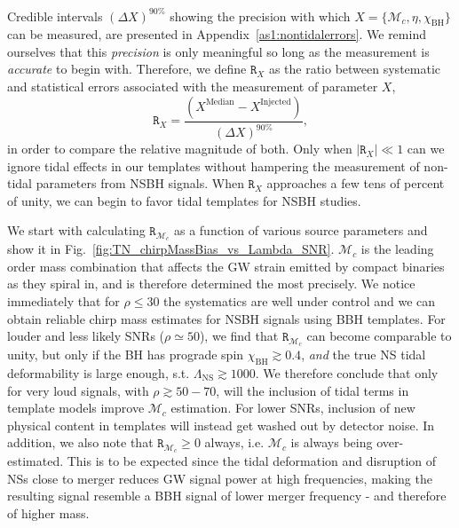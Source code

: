 \documentclass[aps,prd,amsmath,floats,floatfix, twocolumn,
superscriptaddress,nofootinbib,showpacs]{revtex4-1}
\newcommand{\lambdans}{\Lambda_\mathrm{NS}}
\newcommand{\chibh}{\chi_\mathrm{BH}}
\newcommand{\mchirp}{\mathcal{M}_c}
\newcommand{\arr}{\mathtt{R}}
\begin{document}
Credible intervals $(\Delta X)^{90\%}$ showing the precision with which
$X=\{\mchirp,\eta,\chibh\}$ can be measured, are presented in
Appendix~\ref{as1:nontidalerrors}.
We remind ourselves that this {\it precision} is only meaningful so long as the
measurement is {\it accurate} to begin with. Therefore, we define $\arr_X$ as
the ratio between systematic and statistical errors associated with the
measurement of parameter $X$,
\begin{equation}\label{eq:arr}
\arr_X = \dfrac{(X^\mathrm{Median} - X^\mathrm{Injected})}{(\Delta X)^{90\%}},
\end{equation}
in order to compare the relative magnitude of both. Only when
$|\arr_X| \ll 1$ can we ignore tidal effects in our templates
without hampering the measurement of non-tidal parameters from NSBH signals.
When $\arr_X$ approaches a few tens of percent of unity, we can begin to favor
tidal templates for NSBH studies.


We start with calculating $\arr_{\mchirp}$ as a function of various source
parameters and show it in Fig.~\ref{fig:TN_chirpMassBias_vs_Lambda_SNR}.
$\mchirp$ is the leading order
mass combination that affects the GW strain emitted by compact binaries as they
spiral in, and is therefore determined the most precisely. We notice
immediately that for $\rho\leq 30$ the systematics are well under control
and we can obtain reliable chirp mass estimates for NSBH signals using BBH
templates.
% 
For louder and less likely SNRs ($\rho\simeq 50$), we find that
$\arr_{\mchirp}$ can become comparable to unity, but only if the BH has
prograde spin $\chibh\gtrsim 0.4$, {\it and} the true NS tidal deformability
is large enough, s.t. $\lambdans \gtrsim 1000$.
% 
We therefore conclude that only for very loud signals, with
$\rho\gtrsim 50-70$, will the inclusion of tidal terms in template
models improve $\mchirp$ estimation. For lower SNRs, inclusion of new
physical content in templates will instead get washed out by detector noise.
% 
In addition, we also note that $\arr_{\mchirp}\geq 0$ always,
i.e. $\mchirp$ is always being over-estimated. This is to be expected since
the tidal deformation and disruption of NSs close to merger reduces GW signal
power at high frequencies, making the resulting signal resemble a BBH signal of
lower merger frequency - and therefore of higher mass.
\end{document}
